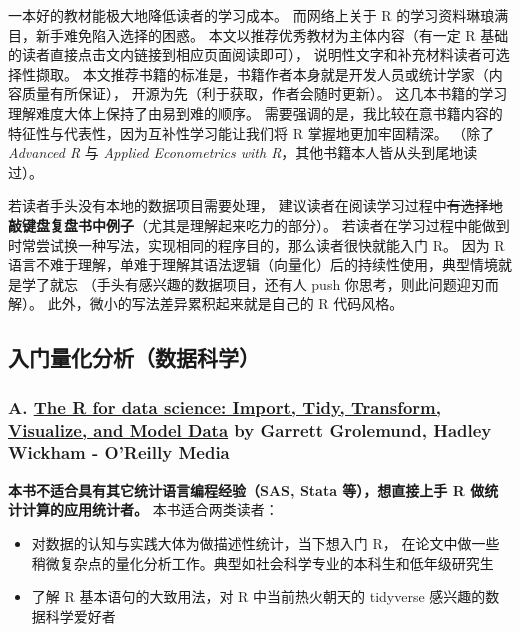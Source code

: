 \documentclass[11pt,hyperref]{ctexart}
\begin{document}
一本好的教材能极大地降低读者的学习成本。 而网络上关于 R
的学习资料琳琅满目，新手难免陷入选择的困惑。
本文以推荐优秀教材为主体内容（有一定 R
基础的读者直接点击文内链接到相应页面阅读即可），
说明性文字和补充材料读者可选择性撷取。
本文推荐书籍的标准是，书籍作者本身就是开发人员或统计学家（内容质量有所保证），
开源为先（利于获取，作者会随时更新）。
这几本书籍的学习理解难度大体上保持了由易到难的顺序。
需要强调的是，我比较在意书籍内容的特征性与代表性，因为互补性学习能让我们将
R 掌握地更加牢固精深。 （除了 \emph{Advanced R} 与 \emph{Applied
Econometrics with R}，其他书籍本人皆从头到尾地读过）。

若读者手头没有本地的数据项目需要处理，
建议读者在阅读学习过程中\sout{有选择地}\textbf{敲键盘复盘书中例子}（尤其是理解起来吃力的部分）。
若读者在学习过程中能做到时常尝试换一种写法，实现相同的程序目的，那么读者很快就能入门
R。 因为 R
语言不难于理解，单难于理解其语法逻辑（向量化）后的持续性使用，典型情境就是学了就忘
（手头有感兴趣的数据项目，还有人 push 你思考，则此问题迎刃而解）。
此外，微小的写法差异累积起来就是自己的 R 代码风格。

\hypertarget{ux5165ux95e8ux91cfux5316ux5206ux6790ux6570ux636eux79d1ux5b66}{%
\subsection{入门量化分析（数据科学）}\label{ux5165ux95e8ux91cfux5316ux5206ux6790ux6570ux636eux79d1ux5b66}}

\hypertarget{a.-the-r-for-data-science-import-tidy-transform-visualize-and-model-data-by-garrett-grolemund-hadley-wickham---oreilly-media}{%
\subsubsection{\texorpdfstring{A. \href{https://r4ds.had.co.nz/}{The R
for data science: Import, Tidy, Transform, Visualize, and Model Data} by
Garrett Grolemund, Hadley Wickham - O'Reilly
Media}{A. The R for data science: Import, Tidy, Transform, Visualize, and Model Data by Garrett Grolemund, Hadley Wickham - O'Reilly Media}}\label{a.-the-r-for-data-science-import-tidy-transform-visualize-and-model-data-by-garrett-grolemund-hadley-wickham---oreilly-media}}

\textbf{本书不适合具有其它统计语言编程经验（SAS, Stata 等），想直接上手
R 做统计计算的应用统计者。} 本书适合两类读者：

\begin{itemize}
\item
  对数据的认知与实践大体为做描述性统计，当下想入门 R，
  在论文中做一些稍微复杂点的量化分析工作。典型如社会科学专业的本科生和低年级研究生
\item
  了解 R 基本语句的大致用法，对 R 中当前热火朝天的 tidyverse
  感兴趣的数据科学爱好者
\end{itemize}
\end{document}
